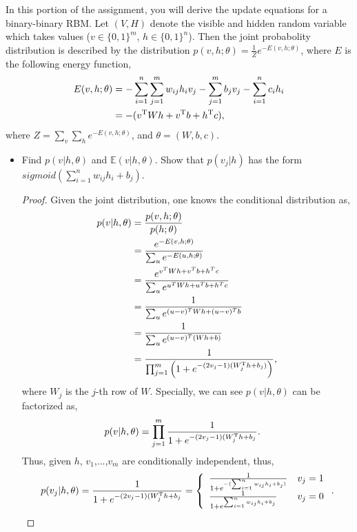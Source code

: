 \documentclass[12pt]{article}
\newcommand{\E}{\mathbb{E}}
\newcommand{\1}{\mathbf{1}}
\begin{document}
{In this portion of the assignment, you will derive the update equations for a binary-binary RBM. Let $(V, H)$ denote the visible and hidden random variable which takes values ($v\in \{0,1\}^{m}$, $h\in \{0,1\}^n$). Then the joint probabolity distribution is described by the distribution $p(v, h;\theta) = \frac{1}{Z} e^{-E(v, h;\theta)}$, where $E$ is the following energy function,
\begin{align*}
  E(v, h; \theta) &= -\sum_{i=1}^n \sum_{j=1}^m w_{ij} h_iv_j - \sum_{j=1}^m b_j v_j - \sum_{i=1}^n c_i h_i \\
  &= -(v^{\rm T}W h + v^{\rm T}b + h^{\rm T}c),
\end{align*}
where $Z = \sum_{v}\sum_{h} e^{-E(v, h; \theta)}$, and $\theta = (W, b,c)$.
\begin{itemize}
  \item Find $p(v|h,\theta)$ and $\E(v|h, \theta)$. Show that $p(v_j|h)$ has the form $sigmoid\left(\sum_{i=1}^n w_{ij} h_i + b_j\right)$.
  \begin{proof}
  Given the joint distribution, one knows the conditional distribution as,
  \begin{align*}
    p(v|h, \theta) &= \frac{p(v,h;\theta)}{p(h; \theta)} \\
    &= \dfrac{e^{-E(v, h;\theta)}}{\sum_{u} e^{-E(u, h; \theta)}} \\
    &= \dfrac{e^{v^TWh + v^Tb + h^Tc}}{\sum_{u} e^{{u}^TWh + {u}^Tb + h^Tc}} \\
    &= \dfrac{1}{\sum_u e^{(u-v)^T W h + (u-v)^T b}} \\
    &= \dfrac{1}{\sum_u e^{(u-v)^T (Wh + b)}} \\
    &= \dfrac{1}{\prod_{j=1}^m \left(1 + e^{-(2v_j - 1)(W_j^{\rm T}h + b_j)}\right)},
  \end{align*}
  where $W_j$ is the $j$-th row of $W$. Specially, we can see $p(v|h, \theta)$ can be factorized as,
  \begin{align*}
    p(v|h, \theta) &= \prod_{j=1}^m \frac{1}{1 + e^{-(2v_j - 1)(W_j^{\rm T}h + b_j}}.
  \end{align*}
  Thus, given $h$, $v_1$,...,$v_m$ are conditionally independent, thus,
  \begin{align*}
    p(v_j|h, \theta) = \frac{1}{1 + e^{-(2v_j - 1)(W_j^{\rm T}h + b_j}} = \left\{\begin{array}{ll} \frac{1}{1 + e^{-(\sum_{i=1}^n w_{ij}h_i + b_j)}} & v_j = 1 \\ \frac{1}{1 + e^{\sum_{i=1}^n w_{ij}h_i + b_j}} & v_j = 0\end{array}\right..

\end{align*}
\end{proof}
\end{itemize}}
\end{document}
